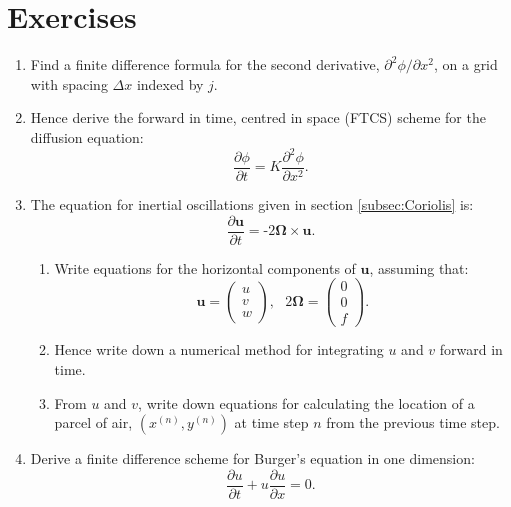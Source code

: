 \section{Exercises}
\begin{enumerate}
\item Find a finite difference formula for the second derivative, $\partial^{2}\phi/\partial x^{2}$,
on a grid with spacing $\Delta x$ indexed by $j$.
\item Hence derive the forward in time, centred in space (FTCS) scheme for
the diffusion equation:
\[
\frac{\partial\phi}{\partial t}=K\frac{\partial^{2}\phi}{\partial x^{2}}.
\]
\item The equation for inertial oscillations given in section \ref{subsec:Coriolis}
is:
\[
\frac{\partial\mathbf{u}}{\partial t}=\text{-}2\bm{\Omega}\times\mathbf{u}.
\]

\begin{enumerate}
\item Write equations for the horizontal components of $\mathbf{u}$, assuming
that:
\[
\mathbf{u}=\left(\begin{array}{c}
u\\
v\\
w
\end{array}\right),\ \ \ 2\bm{\Omega}=\left(\begin{array}{c}
0\\
0\\
f
\end{array}\right).
\]
\item Hence write down a numerical method for integrating $u$ and $v$
forward in time.
\item From $u$ and $v$, write down equations for calculating the location
of a parcel of air, $(x^{(n)},y^{(n)})$ at time step $n$ from the
previous time step.
\end{enumerate}
\item Derive a finite difference scheme for Burger's equation in one dimension:
\[
\frac{\partial u}{\partial t}+u\frac{\partial u}{\partial x}=0.
\]
\end{enumerate}
